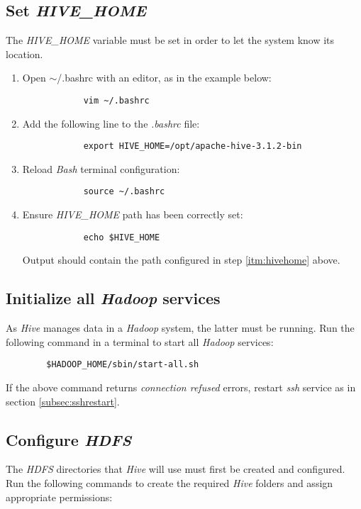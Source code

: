 \documentclass{article}
\begin{document}
    \subsection{Set \emph{HIVE\_HOME}}
    The \emph{HIVE\_HOME} variable must be set in order to let the system know its location.
    \begin{enumerate}
        \item Open $\sim$/.bashrc with an editor, as in the example below:
        \begin{verbatim}
            vim ~/.bashrc
        \end{verbatim}

        \item Add the following line to the \emph{.bashrc} file:
        \label{itm:hivehome}
        \begin{verbatim}
            export HIVE_HOME=/opt/apache-hive-3.1.2-bin
        \end{verbatim}

        \item Reload \emph{Bash} terminal configuration:
        \begin{verbatim}
            source ~/.bashrc
        \end{verbatim}
        
        \item Ensure \emph{HIVE\_HOME} path has been correctly set:
        \begin{verbatim}
            echo $HIVE_HOME
        \end{verbatim}
        Output should contain the path configured in step \ref{itm:hivehome} above.
    \end{enumerate}

    \subsection{Initialize all \emph{Hadoop} services}
    As \emph{Hive} manages data in a \emph{Hadoop} system, the latter must be running.
    Run the following command in a terminal to start all \emph{Hadoop} services:
    \begin{verbatim}
        $HADOOP_HOME/sbin/start-all.sh
    \end{verbatim}
    If the above command returns \emph{connection refused} errors, restart \emph{ssh} service as
    in section \ref{subsec:sshrestart}.

    \subsection{Configure \emph{HDFS}}
    The \emph{HDFS} directories that \emph{Hive} will use must first be created and configured.
    Run the following commands to create the required \emph{Hive} folders and assign appropriate
    permissions:
\end{document}
